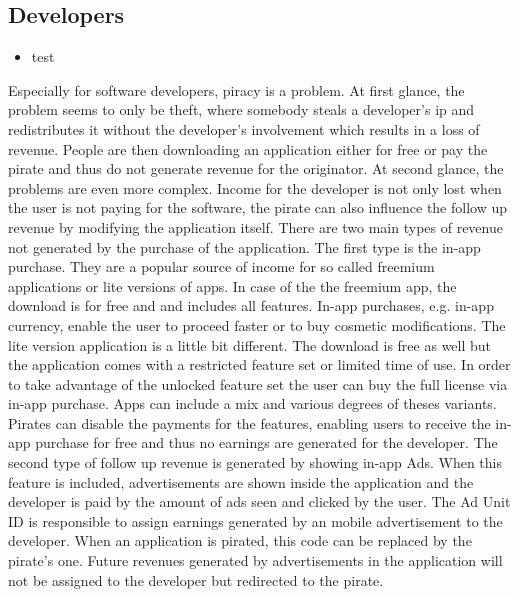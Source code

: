 \subsection{Developers} \label{subsection:foundation-piracy-developers}
\begin{itemize}
    \item test
\end{itemize}
Especially for software developers, piracy is a problem.
At first glance, the problem seems to only be theft, where somebody steals a developer's \gls{ip} and redistributes it without the developer’s involvement which results in a loss of revenue.
People are then downloading an application either for free or pay the pirate and thus do not generate revenue for the originator.
\newline
At second glance, the problems are even more complex.
Income for the developer is not only lost when the user is not paying for the software, the pirate can also influence the follow up revenue by modifying the application itself.
There are two main types of revenue not generated by the purchase of the application.
The first type is the in-app purchase.
They are a popular source of income for so called freemium applications or lite versions of apps.
In case of the the freemium app, the download is for free and and includes all features. In-app purchases, e.g. in-app currency, enable the user to proceed faster or to buy cosmetic modifications.
The lite version application is a little bit different. The download is free as well but the application comes with a restricted feature set or limited time of use.
In order to take advantage of the unlocked feature set the user can buy the full license via in-app purchase.
Apps can include a mix and various degrees of theses variants.
Pirates can disable the payments for the features, enabling users to receive the in-app purchase for free and thus no earnings are generated for the developer.
\newline
The second type of follow up revenue is generated by showing in-app Ads.
When this feature is included, advertisements are shown inside the application and the developer is paid by the amount of ads seen and clicked by the user.
The Ad Unit ID \cite{googleAdmob} is responsible to assign earnings generated by an mobile advertisement to the developer.
When an application is pirated, this code can be replaced by the pirate's one. Future revenues generated by advertisements in the application will not be assigned to the developer but redirected to the pirate.
\newline
